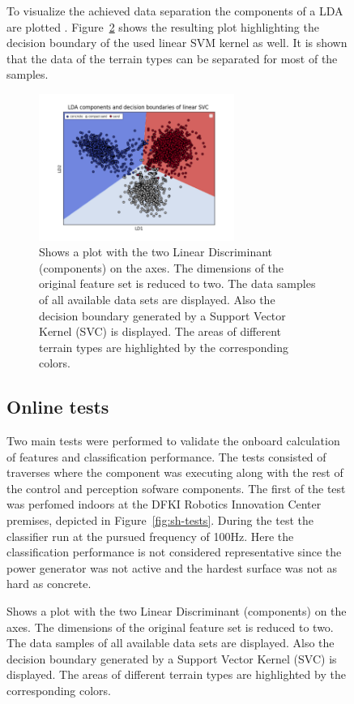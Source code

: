 \documentclass{article}
\begin{document}
\begin{figure}[!htb]
To visualize the achieved data separation the components of a LDA are plotted . Figure~\ref{fig:lda} shows the resulting plot highlighting the decision boundary of the used linear SVM kernel as well. It is shown that the data of the terrain types can be separated for most of the samples.
\begin{figure}[!htb]
 \centering
 \includegraphics[width=0.7\textwidth]{../figures/boundary_LDA_prevTesting_all_sand_concrete_compactsand.png}
 \caption{Shows a plot with the two Linear Discriminant (components) on the axes. The dimensions of the original feature set is reduced to two. The data samples of all available data sets are displayed. Also the decision boundary generated by a Support Vector Kernel (SVC) is displayed. The areas of different terrain types are highlighted by the corresponding colors. }
 \label{fig:lda}
\end{figure}








\subsection{Online tests}

Two main tests were performed to validate the onboard calculation of features and classification performance.
The tests consisted of traverses where the component was executing along with the rest of the control and perception sofware components. 
The first of the test was perfomed indoors at the DFKI Robotics Innovation Center premises, depicted in Figure~\ref{fig:sh-tests}.
During the test the classifier run at the pursued frequency of 100Hz.
Here the classification performance is not considered representative since the power generator was not active and the hardest surface was not as hard as concrete. 


\end{figure}
\end{document}

